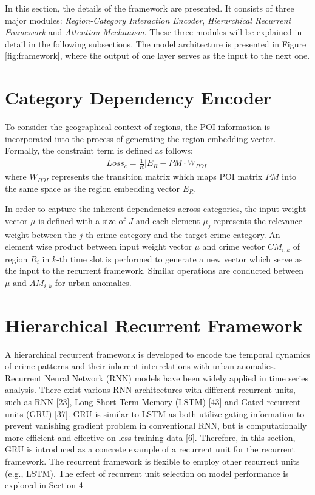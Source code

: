 In this section, the details of the framework are presented. It consists of three major modules: \emph{Region-Category Interaction Encoder}, \emph{Hierarchical Recurrent Framework} and \emph{Attention Mechanism}. These three modules will be explained in detail in the following subsections. The model architecture is presented in Figure \ref{fig:framework}, where the output of one layer serves as the input to the next one.

\section{Category Dependency Encoder}
To consider the geographical context of regions, the POI information is incorporated into the process of generating the region
embedding vector. Formally, the constraint term is defined as follows:
\begin{equation}
    \begin{gathered}
        Loss_c = \frac{1}{R}| E_R - PM \cdot W_{POI} | \label{1}
    \end{gathered}
\end{equation}
where $W_{POI}$ represents the transition matrix which maps POI matrix $PM$ into the same space as the region embedding vector $E_R$.

In order to capture the inherent dependencies across categories,
the input weight vector $\mu$ is defined with a size of $J$ and each element $\mu_j$ represents the relevance weight between the $j\text{-th}$ crime
category and the target crime category. An element wise
product between input weight vector $\mu$ and crime vector $CM_{i,k}$ of region $R_i$ in $k\text{-th}$ time slot is performed to generate a new vector which serve as the input to the recurrent framework. Similar operations are
conducted between $\mu \text{ and } AM_{i,k}$ for urban anomalies.

\section{Hierarchical Recurrent Framework}

A hierarchical recurrent framework is developed to encode the temporal dynamics of crime patterns and their inherent interrelations with urban anomalies. Recurrent Neural Network (RNN) models have been widely applied in time series analysis. There exist various RNN architectures with different recurrent units, such as RNN [23], Long Short Term Memory (LSTM) [43] and Gated recurrent units
(GRU) [37]. GRU is similar to LSTM as both utilize gating information to prevent vanishing gradient problem in conventional RNN, but is computationally more efficient and effective on less training data [6]. Therefore, in this section, GRU is introduced as a concrete example of a recurrent unit for the recurrent framework. The recurrent framework is flexible to employ other recurrent units (e.g., LSTM). The effect of recurrent unit selection on model performance
is explored in Section 4

